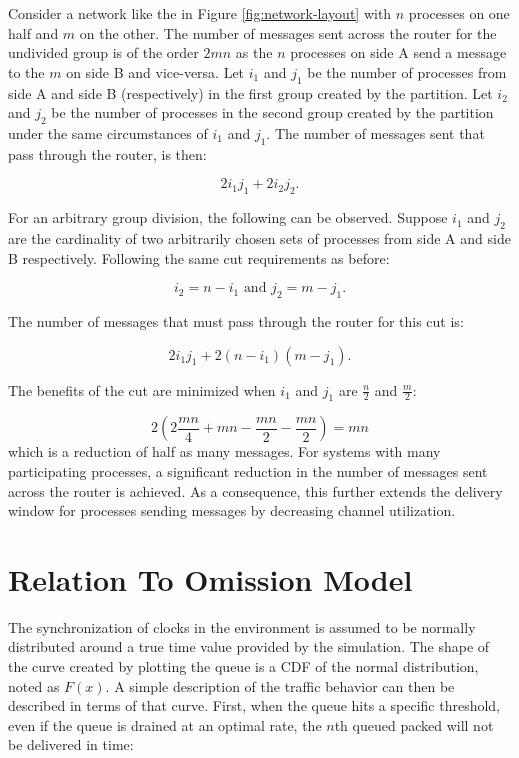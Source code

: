 Consider a network like the in Figure \ref{fig:network-layout} with $n$ processes on one half and $m$ on the other.
The number of messages sent across the router for the undivided group is of the order $2mn$ as the $n$ processes on side A send a message to the $m$ on side B and vice-versa.
Let $i_{1}$ and $j_{1}$ be the number of processes from side A and side B (respectively) in the first group created by the partition.
Let $i_{2}$ and $j_{2}$ be the number of processes in the second group created by the partition under the same circumstances of $i_1$ and $j_1$.
The number of messages sent that pass through the router, is then: 

\begin{equation}
2 i_{1} j_{1} + 2 i_{2} j_{2}.
\end{equation}

For an arbitrary group division, the following can be observed.
Suppose $i_{1}$ and $j_{2}$ are the cardinality of two arbitrarily chosen sets of processes from side A and side B respectively.
Following the same cut requirements as before:

\begin{equation}
i_2 = n - i_1 \text{ and } j_2 = m - j_1.
\end{equation}

The number of messages that must pass through the router for this cut is:

\begin{equation}
2 i_{1} j_{1} + 2 (n-i_{1}) (m-j_{1}).
\end{equation}

The benefits of the cut are minimized when $i_1$ and $j_1$ are $\frac{n}{2}$ and $\frac{m}{2}$:

\begin{equation}
2( 2 \frac{mn}{4} + mn - \frac{mn}{2} - \frac{mn}{2}) = mn
\end{equation}%
which is a reduction of half as many messages.
For systems with many participating processes, a significant reduction in the number of messages sent across the router is achieved.
As a consequence, this further extends the delivery window for processes sending messages by decreasing channel utilization.

\section{Relation To Omission Model}

The synchronization of clocks in the environment is assumed to be normally distributed around a true time value provided by the simulation.
The shape of the curve created by plotting the queue is a \ac{CDF} of the normal distribution, noted as $F(x)$.
A simple description of the traffic behavior can then be described in terms of that curve.
First, when the queue hits a specific threshold, even if the queue is drained at an optimal rate, the $n$th queued packed will not be delivered in time:

